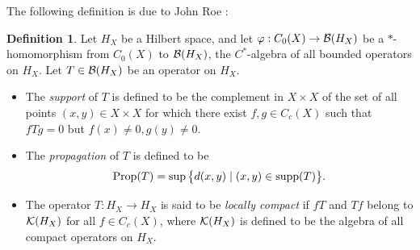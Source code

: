 \documentclass[11pt]{article}
\theoremstyle{definition}
\newtheorem{Def}{Definition}[section]
\theoremstyle{plain}
\def\supp{\textup{supp}}
\def\prop{\textup{Prop}}
\begin{document}
The following definition is due to John Roe \cite{Roe1993}:

\begin{Def}
Let $H_X$ be a Hilbert space, and let $\varphi:C_0(X)\to\mathcal B(H_X)$ be a $*$-homomorphism from $C_0(X)$ to $\mathcal B(H_X)$, the $C^*$-algebra of all bounded operators on $H_X$. Let $T\in\mathcal B(H_X)$ be an operator on $H_X$.
\begin{itemize}
\item[(1)] The {\em support} of $T$ is defined to be the complement in $X\times X$ of the set of all points $(x, y)\in X\times X$ for which there exist $f, g\in C_c(X)$ such that $fTg=0$ but $f(x)\not= 0, g(y)\not=0$.
\item[(2)] The {\em propagation} of $T$ is defined to be
$$\prop(T)=\sup\big\{ d(x,y) \mid (x, y)\in \supp(T) \big\}.$$
\item[(3)] The operator $T: H_X\to H_X$ is said to be {\em locally compact} if $fT$ and $Tf$ belong to $\mathcal K(H_X)$ for all $f\in C_c(X)$, where $\mathcal K(H_X)$ is defined to be the algebra of all compact operators on $H_X$.
\end{itemize}\end{Def}
\end{document}
